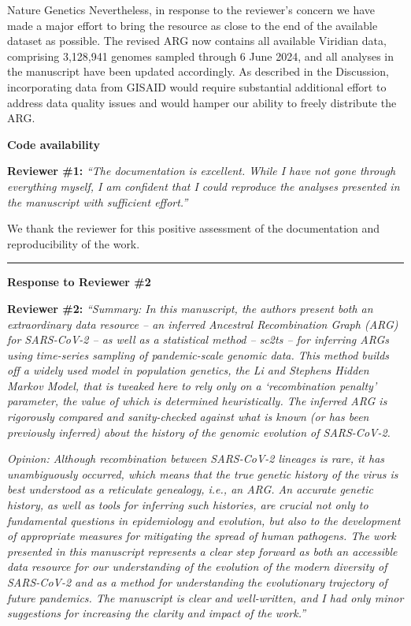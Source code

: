 \documentclass{letter}
\begin{document}
\begin{letter}{Nature Genetics}
Nevertheless, in response to the reviewer’s concern we have made a major effort
to bring the resource as close to the end of the available dataset as possible.
The revised ARG now contains all available Viridian data, comprising 3,128,941
genomes sampled through 6 June 2024, and all analyses in the manuscript have
been updated accordingly. As described in the Discussion, incorporating data
from GISAID would require substantial additional effort to address data quality
issues and would hamper our ability to freely distribute the ARG.

\medskip
\noindent \textbf{Code availability}

\noindent \textbf{Reviewer \#1:} \textit{``The documentation is excellent. While I have
not gone through everything myself, I am confident that I could reproduce the
analyses presented in the manuscript with sufficient effort.''}

We thank the reviewer for this positive assessment of the documentation and reproducibility of the work.

\medskip
\hrule
\medskip

\noindent \textbf{Response to Reviewer \#2}

\noindent \textbf{Reviewer \#2:} \textit{``Summary: In this manuscript, the authors
present both an extraordinary data resource -- an inferred Ancestral
Recombination Graph (ARG) for SARS-CoV-2 -- as well as a statistical method --
sc2ts -- for inferring ARGs using time-series sampling of pandemic-scale
genomic data. This method builds off a widely used model in population
genetics, the Li and Stephens Hidden Markov Model, that is tweaked here to
rely only on a `recombination penalty' parameter, the value of which is
determined heuristically. The inferred ARG is rigorously compared and
sanity-checked against what is known (or has been previously inferred) about
the history of the genomic evolution of SARS-CoV-2.}

\textit{Opinion: Although recombination between SARS-CoV-2 lineages is
rare, it has unambiguously occurred, which means that the true genetic history
of the virus is best understood as a reticulate genealogy, i.e., an ARG. An
accurate genetic history, as well as tools for inferring such histories, are
crucial not only to fundamental questions in epidemiology and evolution, but
also to the development of appropriate measures for mitigating the spread of
human pathogens. The work presented in this manuscript represents a clear step
forward as both an accessible data resource for our understanding of the
evolution of the modern diversity of SARS-CoV-2 and as a method for
understanding the evolutionary trajectory of future pandemics. The manuscript
is clear and well-written, and I had only minor suggestions for increasing the
clarity and impact of the work.''}


\end{letter}
\end{document}
